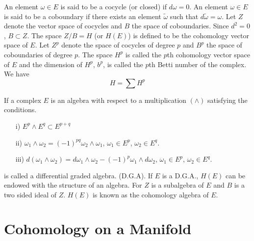An element $\omega\in E$ is said to be a cocycle (or closed) if
$d\omega=0$. An element $\omega\in E$ is said to be a coboundary if
there exists an element $\widetilde{\omega}$ such that
$d\widetilde{\omega}=\omega$. Let $Z$ denote the vector space of
cocycles and $B$ the space of coboundaries. Since $d^{2}=0$, $B\subset
Z$. The space $Z/B=H$ (or $H(E)$) is defined to be the cohomology
vector space of $E$. Let $Z^{p}$ denote the space of cocycles of
degree $p$ and $B^{p}$ the space of coboundaries of degree $p$. The
space $H^{p}$ is called the $p$th cohomology vector space of $E$ and
the dimension of $H^{p}$, $b^{p}$, is called the $p$th Betti number of
the complex. We have
$$
H=\sum H^{p}
$$

If a complex $E$ is an algebra with respect to a multiplication
$(\wedge)$ satisfying the conditions.
\begin{itemize}
\item[i)] $E^{p}\wedge E^{q}\subset E^{p+q}$

\item[ii)]
  $\omega_{1}\wedge\omega_{2}=(-1)^{pq}\omega_{2}\wedge\omega_{1}$,
  $\omega_{1}\in E^{p}$, $\omega_{2}\in E^{q}$.

\item[iii)]
  $d(\omega_{1}\wedge\omega_{2})=d\omega_{1}\wedge\omega_{2}-(-1)^{p}\omega_{1}\wedge
  d\omega_{2}$, $\omega_{1}\in E^{p}$, $\omega_{2}\in E^{q}$. 
\end{itemize}
is called a differential graded algebra. (D.G.A). If $E$ is a D.G.A.,
$H(E)$ can be endowed with the structure of an algebra. For $Z$ is a
subalgebra of $E$ and $B$ is a two sided ideal of $Z$. $H(E)$ is known
as the cohomology algebra of $E$.

\section*{Cohomology on a Manifold}


